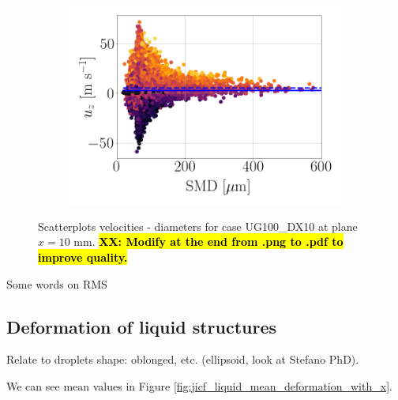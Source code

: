 \begin{figure}[ht]
\begin{subfigure}[b]{0.3\textwidth}
\end{subfigure}
\hfill
\begin{subfigure}[b]{0.3\textwidth}
	\flushleft
   \includegraphics[scale=0.2]{./part2_developments/figures_ch5_resolved_JICF/SPRAY_characterization/velocities/scatter_uz_D.png}
\end{subfigure}
   \caption{Scatterplots velocities - diameters for case UG100\_DX10 at plane $x = 10$ mm. \hl{\textbf{XX: Modify at the end from .png to .pdf to improve quality.}}}
\label{fig:jicf_global_scatterplots}
\end{figure}

Some words on RMS


\clearpage

\subsection{Deformation of liquid structures}

Relate to droplets shape: oblonged, etc. (ellipsoid, look at Stefano PhD).

We can see mean values in Figure \ref{fig:jicf_liquid_mean_deformation_with_x}.

